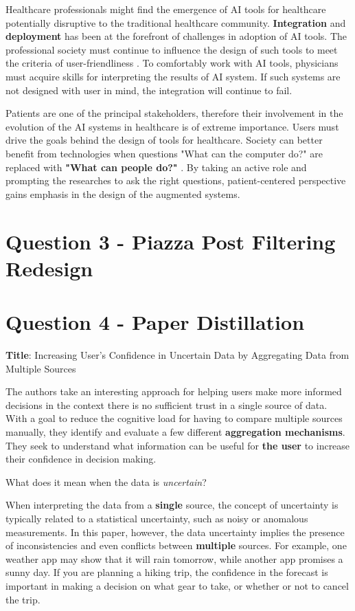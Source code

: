 \documentclass[12pt,letterpaper]{article}
\begin{document}
Healthcare professionals might find the emergence of AI tools for healthcare potentially disruptive to the traditional healthcare community. \textbf{Integration} and \textbf{deployment} has been at the forefront of challenges in adoption of AI tools. The professional society must continue to influence the design of such tools to meet the criteria of user-friendliness \cite{heathfield1993philosophies}. To comfortably work with AI tools, physicians must acquire skills for interpreting the results of AI system. If such systems are not designed with user in mind, the integration will continue to fail. 

Patients are one of the principal stakeholders, therefore their involvement in the evolution of the AI systems in healthcare is of extreme importance. Users must drive the goals behind the design of tools for healthcare. Society can better benefit from technologies when questions "What can the computer do?" are replaced with \textbf{"What can people do?"} \cite{hesse2007ehealth}. By taking an active role and prompting the researches to ask the right questions, patient-centered perspective gains emphasis in the design of the augmented systems. 

\section*{Question 3 - Piazza Post Filtering Redesign}

\section*{Question 4 - Paper Distillation}

\textbf{Title}: Increasing User's Confidence in Uncertain Data by Aggregating Data from Multiple Sources \cite{greis2017increasing}

The authors take an interesting approach for helping users make more informed decisions in the context there is no sufficient trust in a single source of data. With a goal to reduce the cognitive load for having to compare multiple sources manually, they identify and evaluate a few different \textbf{aggregation mechanisms}. They seek to understand what information can be useful for \textbf{the user} to increase their confidence in decision making. 

What does it mean when the data is \textit{uncertain}? 

When interpreting the data from a \textbf{single} source, the concept of uncertainty is typically related to a statistical uncertainty, such as noisy or anomalous measurements. In this paper, however, the data uncertainty implies the presence of inconsistencies and even conflicts between \textbf{multiple} sources. For example, one weather app may show that it will rain tomorrow, while another app promises a sunny day. If you are planning a hiking trip, the confidence in the forecast is important in making a decision on what gear to take, or whether or not to cancel the trip.  
\end{document}
